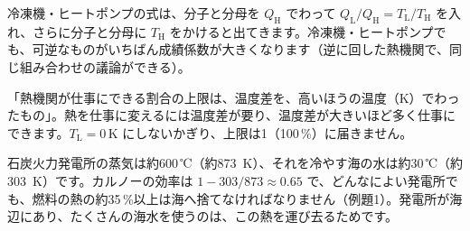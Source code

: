 \begin{phflow}[カルノーの効率]
\end{phflow}
冷凍機・ヒートポンプの式は、分子と分母を $Q_{\mathrm H}$ でわって $Q_{\mathrm L}/Q_{\mathrm H}=T_{\mathrm L}/T_{\mathrm H}$ を入れ、さらに分子と分母に $T_{\mathrm H}$ をかけると出てきます。冷凍機・ヒートポンプでも、可逆なものがいちばん成績係数が大きくなります（逆に回した熱機関で、同じ組み合わせの議論ができる）。\label{ph:熱-5:copc}

\begin{phyomi}[$\eta_{\mathrm C}=(T_{\mathrm H}-T_{\mathrm L})/T_{\mathrm H}$]
「熱機関が仕事にできる割合の上限は、温度差を、高いほうの温度（K）でわったもの」。熱を仕事に変えるには温度差が要り、温度差が大きいほど多く仕事にできます。$T_{\mathrm L}=0$\,K にしないかぎり、上限は1（100\,\%）に届きません。
\end{phyomi}

\begin{phmijika}[発電所の上限]
石炭火力発電所の蒸気は約600\,℃（約\qty{873}{K}）、それを冷やす海の水は約30\,℃（約\qty{303}{K}）です。カルノーの効率は $1-303/873\approx0.65$ で、どんなによい発電所でも、燃料の熱の約35\,\%以上は海へ捨てなければなりません（例題1）。発電所が海辺にあり、たくさんの海水を使うのは、この熱を運び去るためです。
\end{phmijika}

